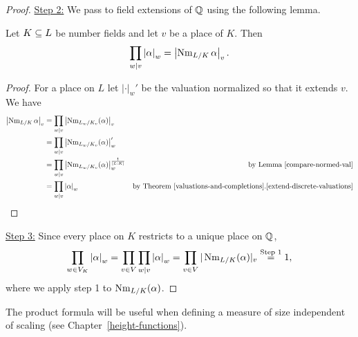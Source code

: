 \begin{proof}
\noindent\underline{Step 2:} We pass to field extensions of $\mathbb{Q}$ using the following lemma.
\begin{lem}
Let $K\subseteq L$ be number fields and let $v$ be a place of $K$.  Then
\[
\prod_{w\mid v} \left| {\alpha} \right|_w
=\left| {\operatorname{Nm}_{L/K}\alpha} \right|_v.
\]
\end{lem}
\begin{proof}
For a place on $L$ let $|\cdot|_w'$ be the valuation normalized so that it extends $v$. 
We have
\begin{align*}
\left| {\operatorname{Nm}_{L/K}\alpha} \right|_v&= \prod_{w\mid v} \left| {\operatorname{Nm}_{L_w/ K_v}(\alpha)} \right|_v\\
&= \prod_{w\mid v} \left| {\operatorname{Nm}_{L_w/ K_v}(\alpha)} \right|_{w}'\\
&= 
\prod_{w\mid v} \left| {\operatorname{Nm}_{L_w/ K_v}(\alpha)} \right|_{w}^{\frac{1}{[L:K]}}
&\text{by Lemma~\ref{compare-normed-val}}\\
&=\prod_{w\mid v}\left| {\alpha} \right|_w
&\text{by Theorem~\ref{valuations-and-completions}.\ref{extend-discrete-valuations}}
\qedhere
\end{align*}
\end{proof}

\noindent\underline{Step 3:} Since every place on $K$ restricts to a unique place on $\mathbb{Q}$,
\[
\prod_{w\in V_K} \left| {\alpha} \right|_w
=\prod_{v\in V} \prod_{w\mid v}\left| {\alpha} \right|_w
=\prod_{v\in V}|\operatorname{Nm}_{L/K}(\alpha)|_v\stackrel{\text{Step }1}=1,
\]
where we apply step 1 to $\operatorname{Nm}_{L/K}(\alpha)$.
\end{proof}
The product formula will be useful when defining a measure of size independent of scaling (see Chapter~\ref{height-functions}).
%
